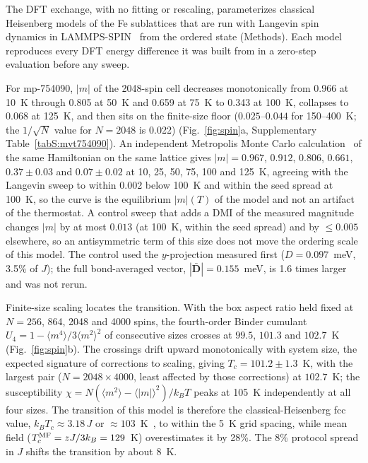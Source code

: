 \documentclass[aps,prb,preprint,superscriptaddress,longbibliography,nofootinbib]{revtex4-2}
\begin{document}
The DFT exchange, with no fitting or rescaling, parameterizes classical Heisenberg models of the Fe
sublattices that are run with Langevin spin dynamics in LAMMPS-SPIN~\cite{tranchida2018} from the ordered
state (Methods). Each model reproduces every DFT energy difference it was built from in a zero-step
evaluation before any sweep.

For mp-754090, $|m|$ of the 2048-spin cell decreases monotonically from 0.966 at 10~K through 0.805 at 50~K
and 0.659 at 75~K to 0.343 at 100~K, collapses to 0.068 at 125~K, and then sits on the finite-size floor
($0.025$--$0.044$ for 150--400~K; the $1/\sqrt{N}$ value for $N=2048$ is 0.022)
(Fig.~\ref{fig:spin}a, Supplementary Table~\ref{tabS:mvt754090}). An independent Metropolis Monte Carlo
calculation~\cite{metropolis1953} of the same Hamiltonian on the same lattice gives $|m| = 0.967$, $0.912$,
$0.806$, $0.661$, $0.37\pm0.03$ and $0.07\pm0.02$ at 10, 25, 50, 75, 100 and 125~K, agreeing with the
Langevin sweep to within 0.002 below 100~K and within the seed spread at 100~K, so the curve is the
equilibrium $|m|(T)$ of the model and not an artifact of the thermostat. A control sweep that adds a DMI of the
measured magnitude changes $|m|$ by at most $0.013$ (at 100~K, within the seed spread) and by $\le0.005$
elsewhere, so an antisymmetric term of this size does not move the ordering scale of this model. The control
used the $y$-projection measured first ($D=0.097$~meV, 3.5\% of $J$); the full bond-averaged vector,
$|\bar{\mathbf{D}}|=0.155$~meV, is 1.6 times larger and was not rerun.

Finite-size scaling locates the transition. With the box aspect ratio held fixed at
$N=256$, 864, 2048 and 4000 spins, the fourth-order Binder cumulant~\cite{binder1981}
$U_4 = 1-\langle m^4\rangle/3\langle m^2\rangle^2$ of consecutive sizes crosses at $99.5$, $101.3$ and
$102.7$~K (Fig.~\ref{fig:spin}b). The crossings drift upward monotonically with system size, the expected
signature of corrections to scaling, giving $T_c = 101.2\pm1.3$~K, with the largest pair
($N=2048\times4000$, least affected by those corrections) at $102.7$~K; the susceptibility
$\chi = N(\langle m^2\rangle-\langle|m|\rangle^2)/k_BT$ peaks at 105~K independently at all four sizes. The
transition of this model is therefore the classical-Heisenberg fcc value, $k_BT_c \approx 3.18\,J$ or
$\approx103$~K~\cite{ritchie1972}, to within the 5~K grid spacing, while mean field ($T_c^{\rm MF} = zJ/3k_B =
129$~K) overestimates it by 28\%. The 8\% protocol spread in $J$ shifts the transition by about 8~K.
\end{document}
